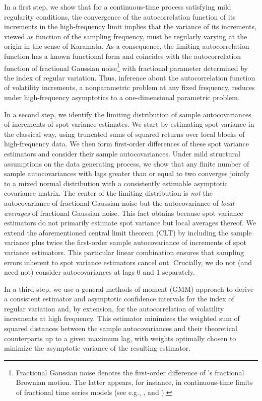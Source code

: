 \documentclass[ecta,nameyear,draft]{econsocart}
\newcommand{\1}{\mathbf 1}
\numberwithin{equation}{section}
\begin{document}
In a first step, we show that for a continuous-time process satisfying mild regularity conditions, the convergence of the autocorrelation function of its increments  in the high-frequency limit implies that the   variance of its increments, viewed as function of the sampling frequency, must be regularly varying at the origin in the sense of Karamata. As a consequence, the limiting autocorrelation function has a known functional form and coincides with the autocorrelation function of fractional Gaussian noise\footnote{Fractional Gaussian noise denotes the first-order difference of \cite{MVN68}'s fractional Brownian motion. The latter appears, for instance, in continuous-time limits of  fractional time series models (see e.g., \cite{S90}, \cite{CR96} and \cite{MW08}).} with fractional parameter determined by the index of regular variation. Thus, inference about the autocorrelation function of volatility increments, a nonparametric problem at any fixed frequency, reduces under high-frequency asymptotics to a one-dimensional parametric problem.

In a second step, we identify the limiting distribution of sample autocovariances of increments of spot variance estimates. We start by estimating spot variance in the classical way, using  truncated sums of squared returns over local blocks of high-frequency data. We then form first-order differences of these spot variance estimators and consider their sample autocovariances. Under mild structural assumptions on the data generating process, we show that any finite number of  sample autocovariances with lags greater than or equal to two converges jointly to a mixed normal distribution with a consistently estimable asymptotic covariance matrix. The center of the limiting distribution is \emph{not} the autocovariance of fractional Gaussian noise but the autocovariance of \emph{local averages} of fractional Gaussian noise. This fact obtains because spot variance estimators do not primarily estimate spot variance but local averages thereof. We extend the aforementioned central limit theorem (CLT) by including   the sample variance  plus twice the first-order sample autocovariance of   increments of   spot variance estimators. This particular linear combination ensures that  sampling errors inherent to spot variance estimators cancel out. Crucially, we do not (and need not) consider autocovariances at lags 0 and   1 separately.

In a third step, we use a general methods of moment (GMM) approach to derive a consistent estimator and asymptotic confidence intervals for the index of regular variation and, by extension, for the autocorrelation of volatility increments at high frequency. This estimator minimizes the weighted sum of squared distances between the sample autocovariances  and their theoretical counterparts up to a given maximum lag, with weights optimally chosen to minimize the asymptotic variance of the resulting estimator. 
\end{document}

